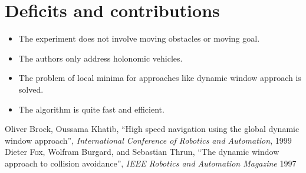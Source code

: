 \documentclass[12pt]{article}
\begin{document}
\section{Deficits and contributions}
\begin{itemize}
    \item The experiment does not involve moving obstacles or moving goal.
    \item The authors only address holonomic vehicles.
    \item The problem of local minima for approaches like dynamic window approach\cite{fox1997dynamic} is solved.
    \item The algorithm is quite fast and efficient.
\end{itemize}
\begin{thebibliography}{1}
	 Oliver Brock, Oussama Khatib, ``High speed navigation using the global dynamic window approach'', \textit{International Conference of Robotics and Automation}, 1999
     Dieter Fox, Wolfram Burgard, and Sebastian Thrun, ``The dynamic window approach to collision avoidance'', \textit{IEEE Robotics and Automation Magazine} 1997
\end{thebibliography}
\end{document}
